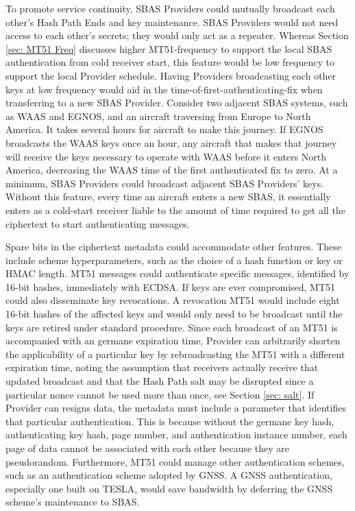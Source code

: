 \documentclass[letterpaper,times]{IONconf/IONconf}
\begin{document}
To promote service continuity, SBAS Providers could mutually broadcast each other's Hash Path Ends and key maintenance.
SBAS Providers would not need access to each other's secrets; they would only act as a repeater.
Whereas Section \ref{sec: MT51 Freq} discusses higher MT51-frequency to support the local SBAS authentication from cold receiver start, this feature would be low frequency to support the local Provider schedule.
Having Providers broadcasting each other keys at low frequency would aid in the time-of-first-authenticating-fix when transferring to a new SBAS Provider.
Consider two adjacent SBAS systems, such as WAAS and EGNOS, and an aircraft traversing from Europe to North America.
It takes several hours for aircraft to make this journey.
If EGNOS broadcasts the WAAS keys once an hour, any aircraft that makes that journey will receive the keys necessary to operate with WAAS before it enters North America, decreasing the WAAS time of the first authenticated fix to zero. 
At a minimum, SBAS Providers could broadcast adjacent SBAS Providers' keys.
Without this feature, every time an aircraft enters a new SBAS, it essentially enters as a cold-start receiver liable to the amount of time required to get all the ciphertext to start authenticating messages.

Spare bits in the ciphertext metadata could accommodate other features.
These include scheme hyperparameters, such as the choice of a hash function or key or HMAC length.
MT51 messages could authenticate specific messages, identified by 16-bit hashes, immediately with ECDSA.
If keys are ever compromised, MT51 could also disseminate key revocations.
A revocation MT51 would include eight 16-bit hashes of the affected keys and would only need to be broadcast until the keys are retired under standard procedure.
Since each broadcast of an MT51 is accompanied with an germane expiration time, Provider can arbitrarily shorten the applicability of a particular key by rebroadcasting the MT51 with a different expiration time, noting the assumption that receivers actually receive that updated broadcast and that the Hash Path salt may be disrupted since a particular nonce cannot be used more than once, see Section \ref{sec: salt}. 
If Provider can resigns data, the metadata must include a parameter that identifies that particular authentication.
This is because without the germane key hash, authenticating key hash, page number, and authentication instance number, each page of data cannot be associated with each other because they are pseudorandom.
Furthermore, MT51 could manage other authentication schemes, such as an authentication scheme adopted by GNSS.
A GNSS authentication, especially one built on TESLA, would save bandwidth by deferring the GNSS scheme's maintenance to SBAS.
\end{document}
